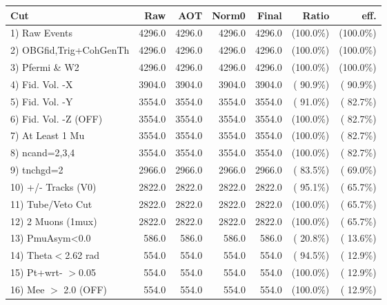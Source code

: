  \begin{table}[h!]\centering
 \begin{tabular}{||l||r|r|r|r|r|r||}
 \hline
 \hline
 Cut & Raw & AOT & Norm0 & Final & Ratio & eff.       \\
 \hline
  1) Raw Events           &       4296.0 &       4296.0 &       4296.0 &       4296.0 & (100.0\%) & (100.0\%) \\
  2) OBGfid,Trig+CohGenTh &       4296.0 &       4296.0 &       4296.0 &       4296.0 & (100.0\%) & (100.0\%) \\
  3) Pfermi \& W2         &       4296.0 &       4296.0 &       4296.0 &       4296.0 & (100.0\%) & (100.0\%) \\
  4) Fid. Vol. -X         &       3904.0 &       3904.0 &       3904.0 &       3904.0 & ( 90.9\%) & ( 90.9\%) \\
  5) Fid. Vol. -Y         &       3554.0 &       3554.0 &       3554.0 &       3554.0 & ( 91.0\%) & ( 82.7\%) \\
  6) Fid. Vol. -Z (OFF)   &       3554.0 &       3554.0 &       3554.0 &       3554.0 & (100.0\%) & ( 82.7\%) \\
  7) At Least 1 Mu        &       3554.0 &       3554.0 &       3554.0 &       3554.0 & (100.0\%) & ( 82.7\%) \\
  8) ncand=2,3,4          &       3554.0 &       3554.0 &       3554.0 &       3554.0 & (100.0\%) & ( 82.7\%) \\
  9) tnchgd=2             &       2966.0 &       2966.0 &       2966.0 &       2966.0 & ( 83.5\%) & ( 69.0\%) \\
 10) +/- Tracks (V0)      &       2822.0 &       2822.0 &       2822.0 &       2822.0 & ( 95.1\%) & ( 65.7\%) \\
 11) Tube/Veto Cut        &       2822.0 &       2822.0 &       2822.0 &       2822.0 & (100.0\%) & ( 65.7\%) \\
 12) 2 Muons (1mux)       &       2822.0 &       2822.0 &       2822.0 &       2822.0 & (100.0\%) & ( 65.7\%) \\
 13) PmuAsym<0.0          &        586.0 &        586.0 &        586.0 &        586.0 & ( 20.8\%) & ( 13.6\%) \\
 14) Theta$<$2.62 rad     &        554.0 &        554.0 &        554.0 &        554.0 & ( 94.5\%) & ( 12.9\%) \\
 15) Pt+wrt- $>$0.05      &        554.0 &        554.0 &        554.0 &        554.0 & (100.0\%) & ( 12.9\%) \\
 16) Mee $>$ 2.0  (OFF)   &        554.0 &        554.0 &        554.0 &        554.0 & (100.0\%) & ( 12.9\%) \\

\end{tabular}
\end{table}
